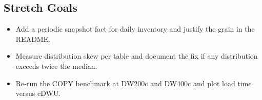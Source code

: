 \subsection*{Stretch Goals}
\begin{itemize}
    \item Add a periodic snapshot fact for daily inventory and justify the grain in the README.
    \item Measure distribution skew per table and document the fix if any distribution exceeds twice the median.
    \item Re-run the COPY benchmark at DW200c and DW400c and plot load time versus cDWU.
\end{itemize}
